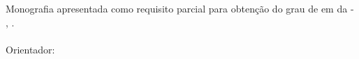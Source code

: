 %
%

\makeatletter
\begin{folhaderosto}
	\thispagestyle{empty}%
	
    \begin{center}
    
		\imprimirnomeautor\\
		\vspace*{8.2 cm}%
		\imprimirtitulotb\\
		
    \end{center}
	
	\vspace*{0.35 cm}%
		    \large%
    		\hfill%
	    	\begin{minipage}{8 cm}%
	    		\begin{small} %
	    		\setlength{\baselineskip}{0.7\baselineskip}
				
		    	{Monografia apresentada como requisito parcial para obtenção do grau de
		    	{\imprimirgrau } em {\imprimirprograma } da {\imprimirinstituicao}{ - }{\imprimirabreviatura},
		    	{\imprimirdepartamento}.}\\{
		    	}\\Orientador: {\imprimirtitulacaoorientador }{ }{\imprimirorientador}
				
				
				\end{small} %
		    \end{minipage}%
		    	
		    \vspace*{10 cm}%
		    
		    \begin{center} %
		    	\normalsize %
	    		\imprimirlocal\\
	    		\imprimirdata
	    	\end{center}%

\end{folhaderosto}
\makeatother
